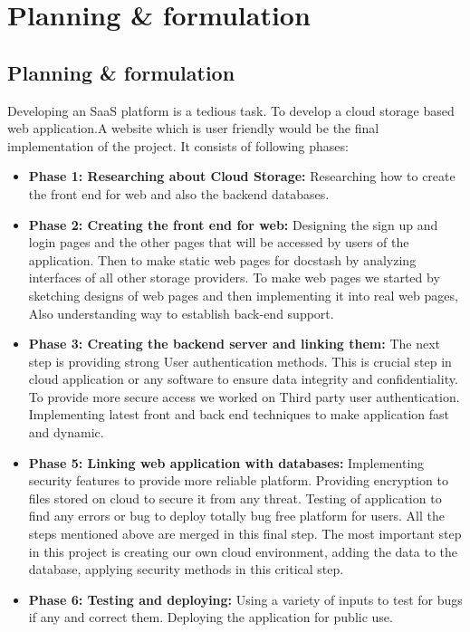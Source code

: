 \chapter{Planning \& formulation}
\newpage
\section{Planning \& formulation}

\hspace{0.6cm} Developing an SaaS platform is a tedious task. To develop a cloud storage based web application.A website which is user friendly would be the final implementation of the project. It consists of following phases:
\begin{itemize}
\item	\textbf{Phase 1: Researching about Cloud Storage:}
    Researching how to create the front end for web and also the backend databases.

\item	\textbf{Phase 2: Creating the front end for web:}
Designing the sign up and login pages and the other pages that will be accessed by users of the application. Then to make static web pages for docstash by analyzing interfaces of all other storage providers. To make web pages we started by sketching designs of web pages and then implementing it into real web pages, Also understanding way to establish back-end support.

\item	\textbf{Phase 3: Creating the backend server and linking them:}
The next step is providing strong User authentication methods. This is crucial step in cloud application or any software to ensure data integrity and confidentiality. To provide more secure access we worked on Third party user authentication. Implementing latest front and back end techniques to make application fast and dynamic.

\item	\textbf{Phase 5: Linking web application with databases:}
Implementing security features to provide more reliable platform. Providing encryption to files stored on cloud to secure it from any threat. Testing of application to find any errors or bug to deploy totally bug free platform for users.  All the steps mentioned above are merged in this final step. The most important step in this project is creating our own cloud environment, adding the data to the database, applying security methods in this critical step. 

\item	\textbf{Phase 6: Testing and deploying:}
Using a variety of inputs to test for bugs if any and correct them. Deploying the application for public use.

\end{itemize}